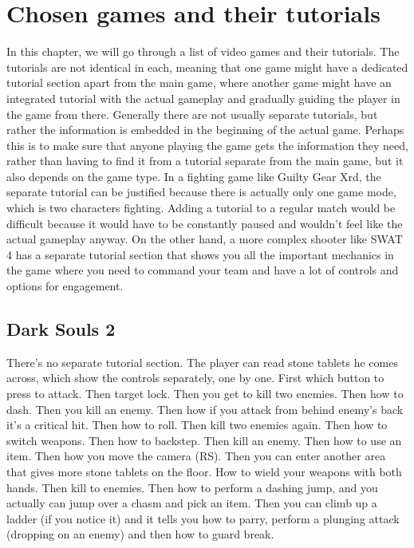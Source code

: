 \chapter{Chosen games and their tutorials}

In this chapter, we will go through a list of video games and their tutorials. The tutorials are not identical in each, meaning that one game might have a dedicated tutorial section apart from the main game, where another game might have an integrated tutorial with the actual gameplay and gradually guiding the player in the game from there. Generally there are not usually separate tutorials, but rather the information is embedded in the beginning of the actual game. Perhaps this is to make sure that anyone playing the game gets the information they need, rather than having to find it from a tutorial separate from the main game, but it also depends on the game type. In a fighting game like Guilty Gear Xrd, the separate tutorial can be justified because there is actually only one game mode, which is two characters fighting. Adding a tutorial to a regular match would be difficult because it would have to be constantly paused and wouldn't feel like the actual gameplay anyway. On the other hand, a more complex shooter like SWAT 4 has a separate tutorial section that shows you all the important mechanics in the game where you need to command your team and have a lot of controls and options for engagement.

\section{Dark Souls 2}

There's no separate tutorial section. The player can read stone tablets he comes across, which show the controls separately, one by one.
First which button to press to attack.
Then target lock.
Then you get to kill two enemies.
Then how to dash.
Then you kill an enemy.
Then how if you attack from behind enemy's back it's a critical hit.
Then how to roll.
Then kill two enemies again.
Then how to switch weapons.
Then how to backstep.
Then kill an enemy.
Then how to use an item.
Then how you move the camera (RS).
Then you can enter another area that gives more stone tablets on the floor.
How to wield your weapons with both hands.
Then kill to enemies.
Then how to perform a dashing jump, and you actually can jump over a chasm and pick an item.
Then you can climb up a ladder (if you notice it) and it tells you how to parry, perform a plunging attack (dropping on an enemy) and then how to guard break.

